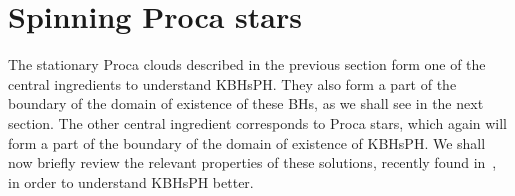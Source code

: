 \section{Spinning Proca stars} 
\label{sec_stars}
The stationary Proca clouds described in the previous section form one of the central ingredients to understand KBHsPH.
They also form a part of the boundary of the domain of existence of these BHs, as we shall see in the next section. The other central ingredient corresponds to Proca stars, which again will form a part of the boundary of the domain of existence of KBHsPH. We shall now briefly review the relevant properties of these solutions, recently found in~\cite{Brito:2015pxa}, in order to understand KBHsPH better.

